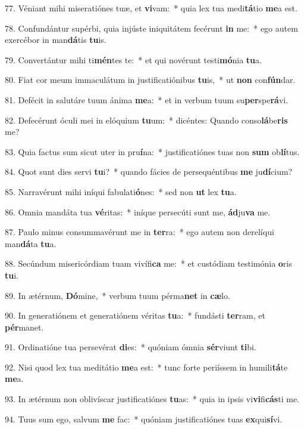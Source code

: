 77. Véniant mihi miseratiónes tuæ, et \textbf{vi}vam:~*  quia lex tua medi\textbf{tá}tio \textbf{me}a est.\

78. Confundántur supérbi, quia injúste iniquitátem fecérunt \textbf{in} me:~*  ego autem exercébor in man\textbf{dá}tis \textbf{tu}is.\

79. Convertántur mihi ti\textbf{mén}tes te:~*  et qui novérunt testi\textbf{mó}nia \textbf{tu}a.\

80. Fiat cor meum immaculátum in justificatiónibus \textbf{tu}is,~*  ut \textbf{non} con\textbf{fún}dar.\

81. Defécit in salutáre tuum ánima \textbf{me}a:~*  et in verbum tuum su\textbf{per}spe\textbf{rá}vi.\

82. Defecérunt óculi mei in elóquium \textbf{tu}um:~*  dicéntes: Quando conso\textbf{lá}be\textbf{ris} me?\

83. Quia factus sum sicut uter in pru\textbf{í}na:~*  justificatiónes tuas non \textbf{sum} ob\textbf{lí}tus.\

84. Quot sunt dies servi \textbf{tu}i?~*  quando fácies de persequéntibus \textbf{me} ju\textbf{dí}cium?\

85. Narravérunt mihi iníqui fabulati\textbf{ó}nes:~*  sed non \textbf{ut} lex \textbf{tu}a.\

86. Omnia mandáta tua \textbf{vé}ritas:~*  iníque persecúti sunt me, \textbf{ád}ju\textbf{va} me.\

87. Paulo minus consummavérunt me in \textbf{ter}ra:~*  ego autem non derelíqui man\textbf{dá}ta \textbf{tu}a.\

88. Secúndum misericórdiam tuam vivífi\textbf{ca} me:~*  et custódiam testimónia \textbf{o}ris \textbf{tu}i.\

89. In ætérnum, \textbf{Dó}mine,~*  verbum tuum pérma\textbf{net} in \textbf{cæ}lo.\

90. In generatiónem et generatiónem véritas \textbf{tu}a:~*  fundásti \textbf{ter}ram, et \textbf{pér}manet.\

91. Ordinatióne tua persevérat \textbf{di}es:~*  quóniam ómnia \textbf{sér}viunt \textbf{ti}bi.\

92. Nisi quod lex tua meditátio \textbf{me}a est:~*  tunc forte periíssem in humili\textbf{tá}te \textbf{me}a.\

93. In ætérnum non oblivíscar justificatiónes \textbf{tu}as:~*  quia in ipsis vi\textbf{vi}fi\textbf{cás}ti me.\

94. Tuus sum ego, salvum \textbf{me} fac:~*  quóniam justificatiónes tuas \textbf{ex}qui\textbf{sí}vi.\

